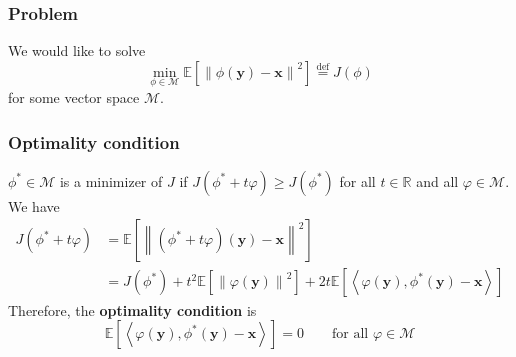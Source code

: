 \documentclass[a4paper,10pt]{article}
\theoremstyle{definition} %
\theoremstyle{definition} %
\theoremstyle{definition} %
\theoremstyle{definition} %
\newcommand{\R}{\mathbb{R}}
\newcommand{\E}[1]{\mathbb{E} \left[ {#1} \right] }
\newcommand{\norm}[1]{\left\| #1 \right \|}
\newcommand{\inner}[1]{\left\langle #1 \right\rangle}
\newcommand{\M}{\mathcal{M}}
\newcommand{\x}{\boldsymbol{x}}
\newcommand{\y}{\boldsymbol{y}}
\newcommand{\0}{\boldsymbol{0}}
\newcommand{\eqdef}{\stackrel{\mathrm{def}}{=}}
\begin{document}
\subsubsection{Problem}
We would like to solve
\begin{equation}\label{eq:general_problem}
    \min_{\phi \in \M} \E{\norm{\phi(\y) - \x}^2} \eqdef J(\phi)
\end{equation}
for some vector space $\M$. 
\subsubsection{Optimality condition}
$\phi^* \in \M$ is a minimizer of $J$ if $J(\phi^* + t \varphi) \geqslant J(\phi^*)$ for all $t \in \R$ and all $\varphi \in \M$. We have 
\begin{align*}
    J(\phi^* + t \varphi) &= \E{\norm{(\phi^* + t \varphi) (\y) - \x}^2} \\
    &= J(\phi^*) + t^2 \E{\norm{\varphi(\y)}^2} + 2t \E{\inner{\varphi(\y), \phi^*(\y) - \x}} 
\end{align*}
Therefore, the \textbf{optimality condition} is 
\begin{equation}\label{eq:optimality_condition}
    \E{\inner{\varphi(\y), \phi^*(\y) - \x}} = 0 \qquad \mbox{for all } \varphi \in \M
\end{equation}


\end{document}
